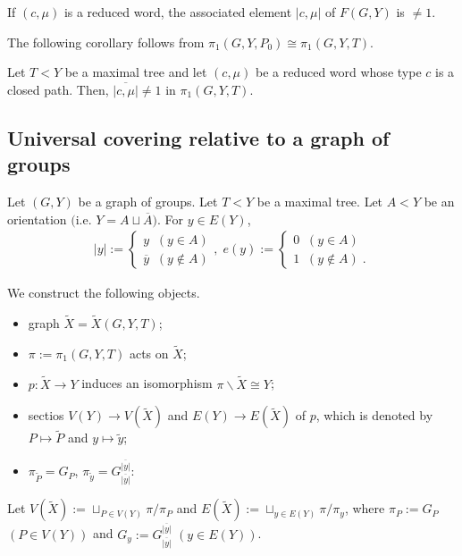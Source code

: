 \begin{theorem}
  If $(c,\mu)$ is a reduced word, the associated element $|c,\mu|$ of $F(G,Y)$ is $\neq 1$.
\end{theorem}

The following corollary follows from $\pi_1(G,Y,P_0) \cong \pi_1(G,Y,T)$. 

\begin{corollary}
  Let $T < Y$ be a maximal tree and let $(c,\mu)$ be a reduced word whose type $c$ is a closed path.
  Then, $\overline{|c,\mu|} \neq 1$ in $\pi_1(G,Y,T)$.
\end{corollary}

\subsection{Universal covering relative to a graph of groups}

Let $(G,Y)$ be a graph of groups.
Let $T < Y$ be a maximal tree.
Let $A < Y$ be an orientation $($i.e. $Y = A \sqcup \overline{A})$.
For $y \in E(Y)$, 
\begin{align*}
  |y| := \left\{\begin{gathered} y\;\;  (y \in A)\\
  \overline{y} \;\; (y \notin A) \end{gathered} \right.
  , \; e(y) := \left\{\begin{gathered} 0 \;\;  (y \in A)\;\;\\
  1 \;\; (y \notin A) \;.\end{gathered} \right.
\end{align*}

We construct the following objects.
\begin{itemize}
  \item graph $\tilde{X} = \tilde{X}(G,Y,T)$;
  \item $\pi := \pi_1(G,Y,T)$ acts on $\tilde{X}$;
  \item $p:\tilde{X} \rightarrow Y$ induces an isomorphism $\pi \backslash \tilde{X} \cong Y$;
  \item sectios $V(Y) \rightarrow V(\tilde{X})$ and $E(Y) \rightarrow E(\tilde{X})$ of $p$, which is denoted by $P \mapsto \tilde{P}$ and $y \mapsto \tilde{y}$;
    \item $\pi_{\tilde{P}} = G_P$, $\pi_{\tilde{y}} = G_{\overline{|y|}}^{\overline{|y|}}$:
\end{itemize}

Let $V(\tilde{X}) := \sqcup_{P \in V(Y)}\pi/\pi_P$ and $E(\tilde{X}) := \sqcup_{y \in E(Y)} \pi/\pi_{y}$, where $\pi_P := G_P$ $(P\in V(Y))$ and $G_y := G_{\overline{|y|}}^{\overline{|y|}}$ $(y \in E(Y))$. \\

